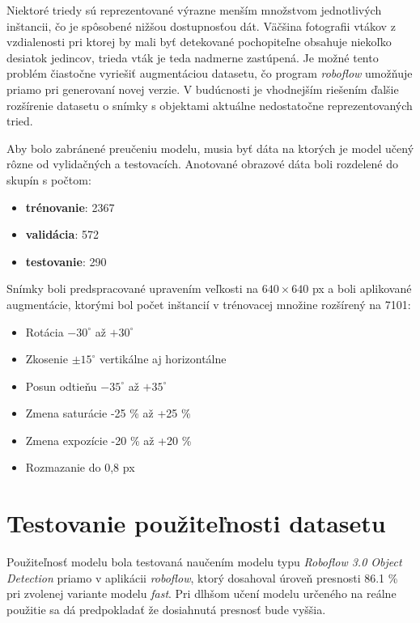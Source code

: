         Niektoré triedy sú reprezentované výrazne menším množstvom jednotlivých inštancii, čo je spôsobené nižšou dostupnosťou dát. Väčšina fotografii vtákov z vzdialenosti pri ktorej by mali byť detekované pochopiteľne obsahuje niekoľko desiatok jedincov, trieda vták je teda nadmerne zastúpená. Je možné tento problém čiastočne vyriešiť augmentáciou datasetu, čo program \emph{roboflow} umožňuje priamo pri generovaní novej verzie. V budúcnosti je vhodnejším riešením ďalšie rozšírenie datasetu o snímky s objektami aktuálne nedostatočne reprezentovaných tried.

        Aby bolo zabránené preučeniu modelu, musia byť dáta na ktorých je model učený rôzne od vylidačných a testovacích. Anotované obrazové dáta boli rozdelené do skupín s počtom:

        \begin{itemize}
            \item \textbf{trénovanie}: 2367
            \item \textbf{validácia}: 572
            \item \textbf{testovanie}: 290
        \end{itemize}

        Snímky boli predspracované upravením veľkosti na \(640 \times 640\) px a boli aplikované augmentácie, ktorými bol počet inštancií v trénovacej množine rozšírený na 7101:

        \begin{itemize}
            \item Rotácia \(-30^\circ\) až \(+30^\circ\)
            \item Zkosenie \(\pm 15^\circ\) vertikálne aj horizontálne
            \item Posun odtieňu \(-35^\circ\) až \(+35^\circ\)
            \item Zmena saturácie -25 \% až +25 \%
            \item Zmena expozície -20 \% až +20 \%
            \item Rozmazanie do 0,8 px
        \end{itemize}

    \section{Testovanie použiteľnosti datasetu}

    Použiteľnosť modelu bola testovaná naučením modelu typu \emph{Roboflow 3.0 Object Detection} priamo v aplikácii \emph{roboflow}, ktorý dosahoval úroveň presnosti 86.1 \% pri zvolenej variante modelu \emph{fast}. Pri dlhšom učení modelu určeného na reálne použitie sa dá predpokladať že dosiahnutá presnosť bude vyššia.

